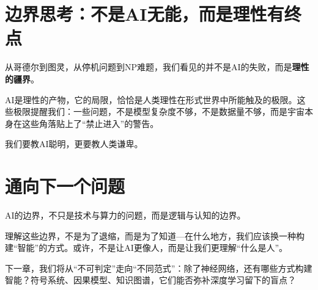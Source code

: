 \section*{边界思考：不是AI无能，而是理性有终点}

从哥德尔到图灵，从停机问题到NP难题，我们看见的并不是AI的失败，而是\textbf{理性的疆界}。

AI是理性的产物，它的局限，恰恰是人类理性在形式世界中所能触及的极限。这些极限提醒我们：一些问题，不是模型复杂度不够，不是数据量不够，而是宇宙本身在这些角落贴上了“禁止进入”的警告。

我们要教AI聪明，更要教人类谦卑。

\section*{通向下一个问题}

AI的边界，不只是技术与算力的问题，而是逻辑与认知的边界。

理解这些边界，不是为了退缩，而是为了知道---在什么地方，我们应该换一种构建“智能”的方式。或许，不是让AI更像人，而是让我们更理解“什么是人”。

下一章，我们将从“不可判定”走向“不同范式”：除了神经网络，还有哪些方式构建智能？符号系统、因果模型、知识图谱，它们能否弥补深度学习留下的盲点？

\nocite{*}
\printbibliography[heading=bibintoc, title=\ebibname]


\newpage
